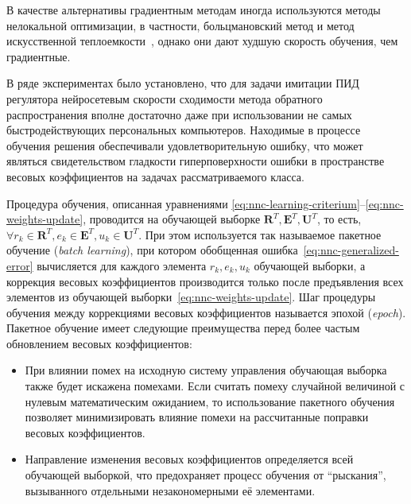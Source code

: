 В качестве альтернативы градиентным методам иногда используются методы
нелокальной оптимизации, в частности, больцмановский метод и метод
искусственной теплоемкости~\cite{wasser92,golovko01}, однако они дают
худшую скорость обучения, чем градиентные.

В ряде экспериментах было установлено, что для задачи имитации ПИД
регулятора нейросетевым скорости сходимости метода обратного
распространения вполне достаточно даже при использовании не самых
быстродействующих персональных компьютеров.  Находимые в процессе
обучения решения обеспечивали удовлетворительную ошибку, что может
являться свидетельством гладкости гиперповерхности ошибки в
пространстве весовых коэффициентов на задачах рассматриваемого класса.


Процедура обучения, описанная уравнениями
\eqref{eq:nnc-learning-criterium}--\eqref{eq:nnc-weights-update},
проводится на обучающей выборке
$\mathbf{R}^T,\mathbf{E}^T,\mathbf{U}^T$, то есть, $\forall
r_k\in\mathbf{R}^T, e_k\in\mathbf{E}^T, u_k\in\mathbf{U}^T$.  При этом
используется так называемое пакетное обучение ({\em batch learning}),
при котором обобщенная ошибка~\eqref{eq:nnc-generalized-error}
вычисляется для каждого элемента $r_k,e_k,u_k$ обучающей выборки, а
коррекция весовых коэффициентов производится только после предъявления
всех элементов из обучающей выборки~\eqref{eq:nnc-weights-update}.
Шаг процедуры обучения между коррекциями весовых коэффициентов
называется эпохой ({\em epoch}).  Пакетное обучение имеет следующие
преимущества перед более частым обновлением весовых коэффициентов:
\begin{itemize}
\item При влиянии помех на исходную систему управления обучающая
  выборка также будет искажена помехами.  Если считать помеху
  случайной величиной с нулевым математическим ожиданием, то
  использование пакетного обучения позволяет минимизировать влияние
  помехи на рассчитанные поправки весовых коэффициентов.
\item Направление изменения весовых коэффициентов определяется всей
  обучающей выборкой, что предохраняет процесс обучения от
  ``рыскания'', вызыванного отдельными незакономерными её элементами.
\end{itemize}


